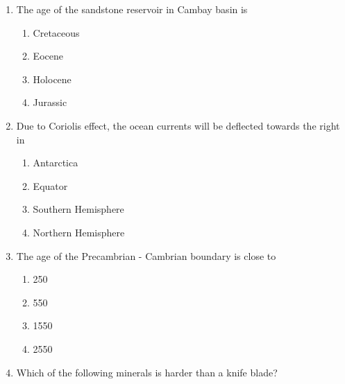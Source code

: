 \documentclass[journal,12pt,onecolumn]{IEEEtran}
\theoremstyle{remark}
\begin{document}
\begin{enumerate}
    \item The age of the sandstone reservoir in Cambay basin is

    \hfill{}
    
    \begin{multicols}{4}
        \begin{enumerate}
            \item Cretaceous
            \item Eocene
            \item Holocene
            \item Jurassic
        \end{enumerate}
    \end{multicols}

    \item Due to Coriolis effect, the ocean currents will be deflected towards the right in

    \hfill{}
    
    \begin{multicols}{2}
        \begin{enumerate}
            \item Antarctica
            \item Equator
            \item Southern Hemisphere
            \item Northern Hemisphere
        \end{enumerate}
    \end{multicols}

    \item The age of the Precambrian - Cambrian boundary  is close to

    \hfill{}
    
    \begin{multicols}{4}
        \begin{enumerate}
            \item 250
            \item 550
            \item 1550
            \item 2550
        \end{enumerate}
    \end{multicols}

    \item Which of the following minerals is harder than a knife blade?


\end{enumerate}
\end{document}
